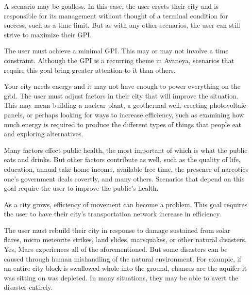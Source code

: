 A scenario may be goalless. In this case, the user erects their city and is responsible for its management without thought of a terminal condition for success, such as a time limit. But as with any other scenarios, the user can still strive to maximize their GPI.


The user must achieve a minimal GPI. This may or may not involve a time constraint. Although the GPI is a recurring theme in Avaneya, scenarios that require this goal bring greater attention to it than others.




Your city needs energy and it may not have enough to power everything on the grid. The user must adjust factors in their city that will improve the situation. This may mean building a nuclear plant, a geothermal well, erecting photovoltaic panels, or perhaps looking for ways to increase efficiency, such as examining how much energy is required to produce the different types of things that people eat and exploring alternatives.


Many factors effect public health, the most important of which is what the public eats and drinks. But other factors contribute as well, such as the quality of life, education, annual take home income, available free time, the presence of narcotics one's government deals covertly, and many others. Scenarios that depend on this goal require the user to improve the public's health.


As a city grows, efficiency of movement can become a problem. This goal requires the user to have their city's transportation network increase in efficiency.


The user must rebuild their city in response to damage sustained from solar flares, micro meteorite strikes, land slides, marsquakes, or other natural disasters. Yes, Mars experiences all of the aforementioned. But some  disasters can be caused through human mishandling of the natural environment. For example, if an entire city block is swallowed whole into the ground, chances are the aquifer it was sitting on was depleted. In many situations, they may be able to avert the disaster entirely.

